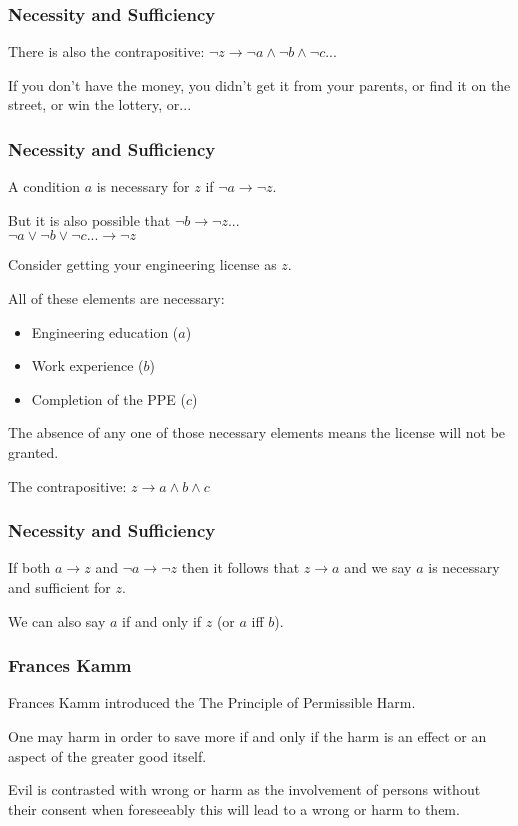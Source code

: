 \begin{frame}
\frametitle{Necessity and Sufficiency}

There is also the contrapositive: $\neg z \rightarrow \neg a \wedge \neg b \wedge \neg c...$

If you don't have the money, you didn't get it from your parents, or find it on the street, or win the lottery, or...


\end{frame}



\begin{frame}
\frametitle{Necessity and Sufficiency}

A condition $a$ is necessary for $z$ if $\neg a \rightarrow \neg z$.

But it is also possible that $\neg b \rightarrow \neg z$...\\
\quad $\neg a \vee \neg b \vee \neg c ... \rightarrow \neg z$

Consider getting your engineering license as $z$.

All of these elements are necessary:

\begin{itemize}
	\item Engineering education ($a$)
	\item Work experience ($b$)
	\item Completion of the PPE ($c$)
\end{itemize}


The absence of any one of those necessary elements means the license will not be granted.

The contrapositive: $z \rightarrow a \wedge b \wedge c$

\end{frame}



\begin{frame}
\frametitle{Necessity and Sufficiency}

If both $a \rightarrow z$ and $\neg a \rightarrow \neg z$ then it follows that $z \rightarrow a$ and we say $a$ is necessary and sufficient for $z$.

We can also say $a$ if and only if $z$ (or $a$ iff $b$).

\end{frame}



\begin{frame}
\frametitle{Frances Kamm}

Frances Kamm introduced the The Principle of Permissible Harm.

One may harm in order to save more if and only if the harm is an effect or an aspect of the greater good itself.

Evil is contrasted with wrong or harm as the involvement of persons without their consent when foreseeably this will lead to a wrong or harm to them.

\end{frame}



